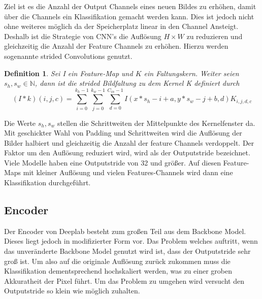 \documentclass[12pt,DIV=15,BCOR=15mm,twoside,headsepline,abstract=true,listof=totoc,bibliography=totoc]{scrreprt}
\newtheorem{defi}{Definition}
\theoremstyle{remark}    %
\begin{document}
    Ziel ist es die Anzahl der Output Channels  eines neuen Bildes zu erhöhen, damit über die Channels ein Klassifikation gemacht 
    werden kann. Dies ist jedoch nicht ohne weiteres möglich da der Speicherplatz linear in den Channel Ansteigt. Deshalb ist die Strategie 
    von CNN's die Auflösung $H\times W$ zu reduzieren und gleichzeitig die Anzahl der Feature Channels zu erhöhen. Hierzu werden sogenannte strided 
    Convolutions genutzt.
    \begin{defi}
    Sei I ein Feature-Map und $K$ ein Faltungskern. Weiter seien $s_h, s_w \in \mathbb{N}$, dann ist die 
    strided Bildfaltung zu dem Kernel K definiert durch 
    \[
    (I * k)(i, j, c) = \sum_{i =0}^{k_h-1}\sum_{j=0}^{k_w-1} \sum_{d = 0}^{C_{in}-1}I(x *s_h-i +a, y*s_w-j+b, d)K_{i,j,d,c}
    \]
    \end{defi}\noindent
    Die Werte $s_h, s_w$ stellen die Schrittweiten der Mittelpunkte des Kernelfenster da. Mit geschickter Wahl von Padding und Schrittweiten wird 
    die Auflösung der Bilder halbiert und gleichzeitig die Anzahl der feature Channels verdoppelt. Der Faktor um den Auflösung reduziert 
    wird, wird als der Outputstride bezeichnet. Viele Modelle haben eine Outputstride von 32 und größer. Auf diesen Feature-Maps mit kleiner Auflösung und vielen 
    Features-Channels wird dann eine Klassifikation durchgeführt.

    \subsection{Encoder}
    Der Encoder von Deeplab besteht zum großen Teil aus dem Backbone Model. Dieses liegt jedoch in modifizierter Form vor.
    Das Problem welches auftritt, wenn das unveränderte Backbone Model genutzt wird ist, dass der Outputstride sehr groß ist. Um also auf die originale Auflösung zurück 
    zukommen muss die Klassifikation dementsprechend hochskaliert werden, was zu einer groben Akkuratheit der Pixel führt. Um das Problem zu umgehen wird versucht den 
    Outputstride so klein wie möglich zuhalten.
\end{document}
